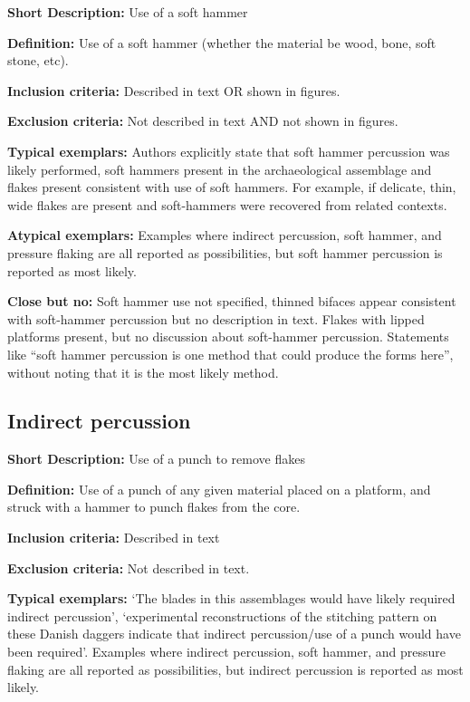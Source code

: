 \documentclass[
]{article}
\begin{document}
\textbf{Short Description:} Use of a soft hammer

\textbf{Definition:} Use of a soft hammer (whether the material be wood,
bone, soft stone, etc).

\textbf{Inclusion criteria:} Described in text OR shown in figures.

\textbf{Exclusion criteria:} Not described in text AND not shown in
figures.

\textbf{Typical exemplars:} Authors explicitly state that soft hammer
percussion was likely performed, soft hammers present in the
archaeological assemblage and flakes present consistent with use of soft
hammers. For example, if delicate, thin, wide flakes are present and
soft-hammers were recovered from related contexts.

\textbf{Atypical exemplars:} Examples where indirect percussion, soft
hammer, and pressure flaking are all reported as possibilities, but soft
hammer percussion is reported as most likely.

\textbf{Close but no:} Soft hammer use not specified, thinned bifaces
appear consistent with soft-hammer percussion but no description in
text. Flakes with lipped platforms present, but no discussion about
soft-hammer percussion. Statements like ``soft hammer percussion is one
method that could produce the forms here'', without noting that it is
the most likely method.

\hypertarget{indirect-percussion}{%
\subsection{Indirect percussion}\label{indirect-percussion}}

\textbf{Short Description:} Use of a punch to remove flakes

\textbf{Definition:} Use of a punch of any given material placed on a
platform, and struck with a hammer to punch flakes from the core.

\textbf{Inclusion criteria:} Described in text

\textbf{Exclusion criteria:} Not described in text.

\textbf{Typical exemplars:} `The blades in this assemblages would have
likely required indirect percussion', `experimental reconstructions of
the stitching pattern on these Danish daggers indicate that indirect
percussion/use of a punch would have been required'. Examples where
indirect percussion, soft hammer, and pressure flaking are all reported
as possibilities, but indirect percussion is reported as most likely.
\end{document}

